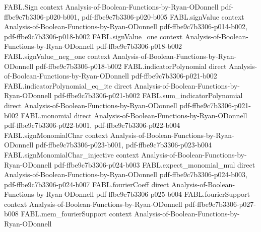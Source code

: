 \begin{theorem}
\label{FABL.totalStableInfluence_one_third_sq_le_maximum_mul_totalInfluence_sq}
\leanok
{}
\proofstep
  {FABL.Sign}
  {context}
  {Analysis-of-Boolean-Functions-by-Ryan-ODonnell}
  {pdf-ffbe9c7b3306-p020-b001,
    pdf-ffbe9c7b3306-p020-b005}
\proofstep
  {FABL.signValue}
  {context}
  {Analysis-of-Boolean-Functions-by-Ryan-ODonnell}
  {pdf-ffbe9c7b3306-p014-b002,
    pdf-ffbe9c7b3306-p018-b002}
\proofstep
  {FABL.signValue_one}
  {context}
  {Analysis-of-Boolean-Functions-by-Ryan-ODonnell}
  {pdf-ffbe9c7b3306-p018-b002}
\proofstep
  {FABL.signValue_neg_one}
  {context}
  {Analysis-of-Boolean-Functions-by-Ryan-ODonnell}
  {pdf-ffbe9c7b3306-p018-b002}
\proofstep
  {FABL.indicatorPolynomial}
  {direct}
  {Analysis-of-Boolean-Functions-by-Ryan-ODonnell}
  {pdf-ffbe9c7b3306-p021-b002}
\proofstep
  {FABL.indicatorPolynomial_eq_ite}
  {direct}
  {Analysis-of-Boolean-Functions-by-Ryan-ODonnell}
  {pdf-ffbe9c7b3306-p021-b002}
\proofstep
  {FABL.sum_indicatorPolynomial}
  {direct}
  {Analysis-of-Boolean-Functions-by-Ryan-ODonnell}
  {pdf-ffbe9c7b3306-p021-b002}
\proofstep
  {FABL.monomial}
  {direct}
  {Analysis-of-Boolean-Functions-by-Ryan-ODonnell}
  {pdf-ffbe9c7b3306-p022-b001,
    pdf-ffbe9c7b3306-p022-b004}
\proofstep
  {FABL.signMonomialChar}
  {context}
  {Analysis-of-Boolean-Functions-by-Ryan-ODonnell}
  {pdf-ffbe9c7b3306-p023-b001,
    pdf-ffbe9c7b3306-p023-b004}
\proofstep
  {FABL.signMonomialChar_injective}
  {context}
  {Analysis-of-Boolean-Functions-by-Ryan-ODonnell}
  {pdf-ffbe9c7b3306-p024-b003}
\proofstep
  {FABL.expect_monomial_mul}
  {direct}
  {Analysis-of-Boolean-Functions-by-Ryan-ODonnell}
  {pdf-ffbe9c7b3306-p024-b003,
    pdf-ffbe9c7b3306-p024-b007}
\proofstep
  {FABL.fourierCoeff}
  {direct}
  {Analysis-of-Boolean-Functions-by-Ryan-ODonnell}
  {pdf-ffbe9c7b3306-p025-b004}
\proofstep
  {FABL.fourierSupport}
  {context}
  {Analysis-of-Boolean-Functions-by-Ryan-ODonnell}
  {pdf-ffbe9c7b3306-p027-b008}
\proofstep
  {FABL.mem_fourierSupport}
  {context}
  {Analysis-of-Boolean-Functions-by-Ryan-ODonnell}

\end{theorem}
